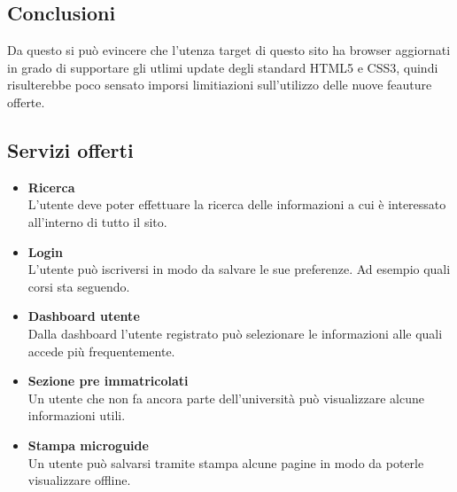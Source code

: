 \subsection{Conclusioni}
Da questo si può evincere che l'utenza target di questo sito ha browser aggiornati in grado di supportare gli utlimi update degli standard HTML5 e CSS3, quindi risulterebbe poco sensato imporsi limitiazioni sull'utilizzo delle nuove feauture offerte.

\subsection{Servizi offerti}
\begin{itemize}
    \item \textbf{Ricerca} \\ L'utente deve poter effettuare la ricerca delle informazioni a cui è interessato all'interno di tutto il sito.
    \item \textbf{Login} \\ L'utente può iscriversi in modo da salvare le sue preferenze. Ad esempio quali corsi sta seguendo.
    \item \textbf{Dashboard utente} \\ Dalla dashboard l'utente registrato può selezionare le informazioni alle quali accede più frequentemente.
    \item \textbf{Sezione pre immatricolati} \\ Un utente che non fa ancora parte dell'università può visualizzare alcune informazioni utili. %
    \item \textbf{Stampa microguide} \\ Un utente può salvarsi tramite stampa alcune pagine in modo da poterle visualizzare offline.
\end{itemize}